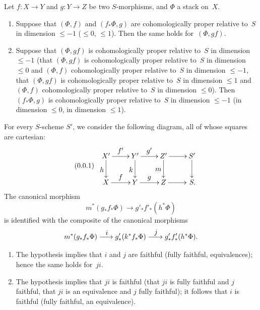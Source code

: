 \begin{proposition}
\label{XIII.1.6}
Let $f \colon X \to Y$ and $g \colon Y \to Z$ be two $S$-morphisms, and
$\Phi$ a stack on~$X$.
\begin{enumerate}
\item[1)] Suppose that $(\Phi,f)$ and $(f_* \Phi, g)$ are
cohomologically proper relative to~$S$ in dimension
$\leqslant -1$ (\resp $\leqslant 0$, \resp $\leqslant 1$). Then the
same holds for~$(\Phi, gf)$.
\item[2)] Suppose that $(\Phi, gf)$ is cohomologically proper
relative to~$S$ in dimension $\leqslant -1$ (\resp that $(\Phi,
gf)$ is cohomologically proper relative to~$S$ in dimension
$\leqslant 0$ and $(\Phi,f)$ cohomologically proper relative
to~$S$ in dimension $\leqslant -1$, \resp that $(\Phi, gf)$ is
cohomologically proper relative to~$S$ in dimension
$\leqslant 1$ and $(\Phi, f)$ cohomologically proper relative
to~$S$ in dimension $\leqslant 0$). Then $(f_* \Phi, g)$ is
cohomologically proper relative to~$S$ in dimension
$\leqslant -1$ (\resp in dimension $\leqslant 0$, \resp in dimension
$\leqslant 1$).
\end{enumerate}
\end{proposition}

For every $S$-scheme $S'$, we consider the following diagram,
all of whose squares are cartesian:
\begin{equation*}
\label{eq:XIII.1.6.1}
\tag{\thesubsection.1}
\begin{array}{c}
\xymatrix{ X' \ar[r]^{f'} \ar[d]_h & Y'
\ar[r]^{g'} \ar[d]_k & Z' \ar[r] \ar[d]_{m} & S' \ar[d] \\ X \ar[r]^f
& Y \ar[r]^g & Z \ar[r] & \,S. }
\end{array}
\end{equation*}
The
canonical morphism
$$
m^* (g_* f_* \Phi) \to g'_* f'_* (h^* \Phi)
$$
is identified
with the composite of the canonical morphisms
$$
m^*(g_* f_* \Phi) \lto{i} g'_*(k^*f_* \Phi) \lto{j} g'_* f'_*(h^* \Phi).
$$
\begin{enumerate}
\item[1)] The hypothesis implies that $i$ and $j$ are
faithful (\resp fully faithful, \resp
equi\-va\-lences); hence the same holds for~$ji$.
\item[2)] The hypothesis implies that $ji$ is faithful
(\resp that $ji$ is
fully
faithful and $j$ faithful, \resp that $ji$ is an equivalence
and $j$ fully faithful); it follows that $i$ is
faithful (\resp fully faithful, \resp an equivalence).
\end{enumerate}

